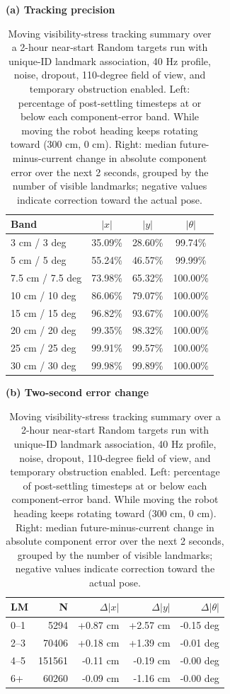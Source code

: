 \begin{table}[!htbp]
    \centering
    \caption{\scriptsize Moving visibility-stress tracking summary over a 2-hour near-start Random targets run with unique-ID landmark association, 40 Hz profile, noise, dropout, 110-degree field of view, and temporary obstruction enabled. Left: percentage of post-settling timesteps at or below each component-error band. While moving the robot heading keeps rotating toward (300 cm, 0 cm). Right: median future-minus-current change in absolute component error over the next 2 seconds, grouped by the number of visible landmarks; negative values indicate correction toward the actual pose.}
    \label{tab:visibility-stress-tracking-summary}
    \scriptsize
    \begin{minipage}[t]{0.49\linewidth}
        \centering
        \textbf{(a) Tracking precision}\\[0.25em]
        \setlength{\tabcolsep}{5pt}
        \begin{tabular}{lccc}
            \toprule
            Band & $|x|$ & $|y|$ & $|\theta|$ \\
            \midrule
            3 cm / 3 deg & 35.09\% & 28.60\% & 99.74\% \\
            5 cm / 5 deg & 55.24\% & 46.57\% & 99.99\% \\
            7.5 cm / 7.5 deg & 73.98\% & 65.32\% & 100.00\% \\
            10 cm / 10 deg & 86.06\% & 79.07\% & 100.00\% \\
            15 cm / 15 deg & 96.82\% & 93.67\% & 100.00\% \\
            20 cm / 20 deg & 99.35\% & 98.32\% & 100.00\% \\
            25 cm / 25 deg & 99.91\% & 99.57\% & 100.00\% \\
            30 cm / 30 deg & 99.98\% & 99.89\% & 100.00\% \\
            \bottomrule
        \end{tabular}
    \end{minipage}
    \hfill
    \begin{minipage}[t]{0.49\linewidth}
        \centering
        \textbf{(b) Two-second error change}\\[0.25em]
        \setlength{\tabcolsep}{4pt}
        \begin{tabular}{lrrrr}
            \toprule
            LM & N & $\Delta |x|$ & $\Delta |y|$ & $\Delta |\theta|$ \\
            \midrule
            0--1 & 5294 & +0.87 cm & +2.57 cm & -0.15 deg \\
            2--3 & 70406 & +0.18 cm & +1.39 cm & -0.01 deg \\
            4--5 & 151561 & -0.11 cm & -0.19 cm & -0.00 deg \\
            6+ & 60260 & -0.09 cm & -1.16 cm & -0.00 deg \\
            \bottomrule
        \end{tabular}
    \end{minipage}
\end{table}

